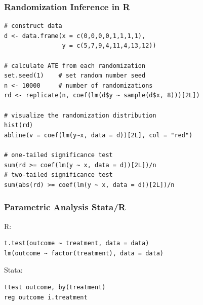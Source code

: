 


\begin{frame}[fragile]

\frametitle{Randomization Inference in R}

\footnotesize

\begin{verbatim}
# construct data
d <- data.frame(x = c(0,0,0,0,1,1,1,1), 
                y = c(5,7,9,4,11,4,13,12))

# calculate ATE from each randomization
set.seed(1)    # set random number seed
n <- 10000     # number of randomizations
rd <- replicate(n, coef(lm(d$y ~ sample(d$x, 8)))[2L])

# visualize the randomization distribution
hist(rd)
abline(v = coef(lm(y~x, data = d))[2L], col = "red")

# one-tailed significance test
sum(rd >= coef(lm(y ~ x, data = d))[2L])/n
# two-tailed significance test
sum(abs(rd) >= coef(lm(y ~ x, data = d))[2L])/n
\end{verbatim}

\end{frame}


\begin{frame}[fragile]

\frametitle{Parametric Analysis Stata/R}

R:\small
\begin{verbatim}
t.test(outcome ~ treatment, data = data)
lm(outcome ~ factor(treatment), data = data)
\end{verbatim}

\vspace{1em}

Stata:\small
\begin{verbatim}
ttest outcome, by(treatment)
reg outcome i.treatment
\end{verbatim}

\end{frame}




\appendix
\frame{}


